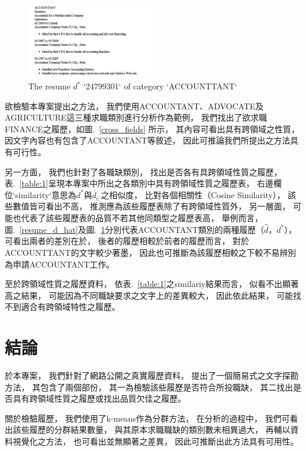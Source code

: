 \documentclass[sigconf]{acmart}
\begin{document}
\begin{figure}[t]
    \centerline{\includegraphics[width=0.5\textwidth]{resume_d_star.png}}
    \caption{The resume $d^{*}$ `24799301` of category `ACCOUNTTANT`}
    \label{resume_d_star}
\end{figure}

欲檢驗本專案提出之方法，
我們使用ACCOUNTANT、ADVOCATE及AGRICULTURE這三種求職類別進行分析作為範例，
我們找出了欲求職FINANCE之履歷，如圖.~\ref{cross_fields} 所示，
其內容可看出具有跨領域之性質，
因文字內容也有包含了ACCOUNTANT等敘述，
因此可推論我們所提出之方法具有可行性。

另一方面，
我們也針對了各職缺類別，
找出是否各有具跨領域性質之履歷，
表.~\ref{table:1}呈現本專案中所出之各類別中具有跨領域性質之履歷表，
右邊欄位`similarity`意思為$d^{*}$與$\overline{d}_{c^{'}}$之相似度，
比對各個相關性（Cosine Similarity），
該些數值皆可看出不高，
推測應為該些履歷表除了有跨領域性質外，
另一層面，
可能也代表了該些履歷表的品質不若其他同類型之履歷表高，
舉例而言，
圖.~\ref{resume_d_hat}及圖.~\ref{resume_d_star}分別代表ACCOUNTANT類別的兩種履歷（$\hat{d}$，$d^{*}$），
可看出兩者的差別在於，
後者的履歷相較於前者的履歷而言，
對於ACCOUNTTANT的文字較少著墨，
因此也可推斷為該履歷相較之下較不易辨別為申請ACCOUNTANT工作。

至於跨領域性質之履歷資料，
依表.~\ref{table:1}之similariy結果而言，
似看不出顯著高之結果，
可能因為不同職缺要求之文字上的差異較大，
因此依此結果，
可能找不到適合有跨領域特性之履歷。

\section{結論}

於本專案，
我們針對了網路公開之真實履歷資料，
提出了一個簡易式之文字探勘方法，
其包含了兩個部份，
其一為檢驗該些履歷是否符合所投職缺，
其二找出是否具有跨領域性質之履歷或找出品質欠佳之履歷。

關於檢驗履歷，
我們使用了k-means作為分群方法，
在分析的過程中，
我們可看出該些履歷的分群結果數量，
與其原本求職職缺的類別數未相異過大，
再輔以資料視覺化之方法，
也可看出並無顯著之差異，
因此可推斷出此方法具有可用性。
\end{document}
